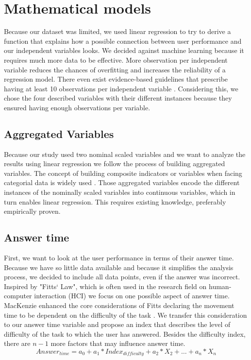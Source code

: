 
\chapter{Mathematical models}
Because our dataset was limited, we used linear regression to try to derive a function that explains how a possible connection 
between user performance and our independent variables looks. We decided against machine learning because it requires much more
data to be effective. More observation per independent variable reduces the chances of overfitting and increases the reliability of a regression
model. There even exist evidence-based guidelines that prescribe having at least 10 observations per independent variable \citep*{Harrell.2015}.
Considering this, we chose the four described variables with their different instances because they ensured having enough observations per
variable.

\section{Aggregated Variables}
Because our study used two nominal scaled variables and we want to analyze the results using linear regression we follow the process
of building aggregated variables. The concept of building composite indicators or variables when facing categorial data is widely used
\citep*{MichelaNardo.2005, Lauro.2018}. Those aggregated variables encode the different instances of the nominally scaled variables into
continuous variables, which in turn enables linear regression. This requires existing knowledge, preferably empirically proven.
\section{Answer time}
First, we want to look at the user performance in terms of their answer time. Because we have so little data available and
because it simplifies the analysis process, we decided to include all data points, even if the answer was incorrect.
Inspired by "Fitts‘ Law", which is often used in the research field on human-computer interaction (HCI) we focus on one possible aspect of answer
time. MacKenzie enhanced the core considerations of Fitts declaring the movement time to be dependent on the difficulty of the task \citep*{MacKenzie.1992}.
We transfer this consideration to our answer time variable and propose an index that describes the level of difficulty of the task to which
the user has answered. Besides the difficulty index, there are $n-1$ more factors that may influence answer time.
\begin{equation} \label{answerTimeEquation}
    Answer_{time} = a_0 + a_1 * Index_{difficulty} + a_2 * X_2 + \dots + a_n * X_n
\end{equation}


